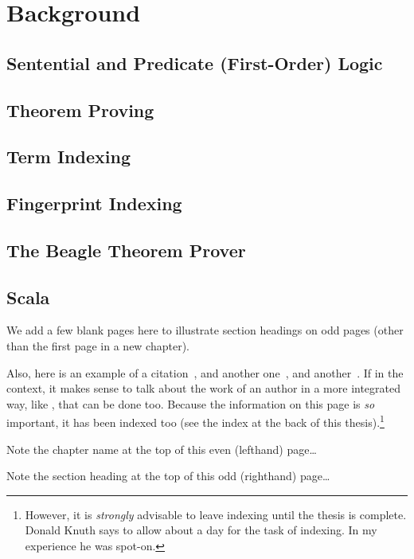 
\chapter{Background}
\label{cha:background}

\section{Sentential and Predicate (First-Order) Logic}
\label{sec:senfol}

\section{Theorem Proving}
\label{sec:proving}

\section{Term Indexing}
\label{sec:indexing}

\section{Fingerprint Indexing}
\label{sec:fingerprint}

\section{The Beagle Theorem Prover}
\label{sec:beagle}

\section{Scala}
\label{sec:scala}

We add a few blank pages here to illustrate section
headings on odd
pages (other than the first page in a new chapter).

Also, here is an example of a citation~\cite{lamport94}, and another
one~\cite{knuth86}, and another~\cite{goossens94}.  If in the context,
it makes sense to talk about the work of an author in a more
integrated way, like , that can be done
too.  Because the information on this page
is \emph{so} important, it has been indexed too (see the index at the
back of this thesis).\footnote{However, it is \emph{strongly}
  advisable to leave indexing until the thesis is complete.  Donald
  Knuth says to allow about a day for the task of indexing.  In my
  experience he was spot-on.}

\clearpage Note the chapter name at the top of this even (lefthand)
page\dots

\cleardoublepage
Note the section heading at the top of this odd (righthand) page\dots

